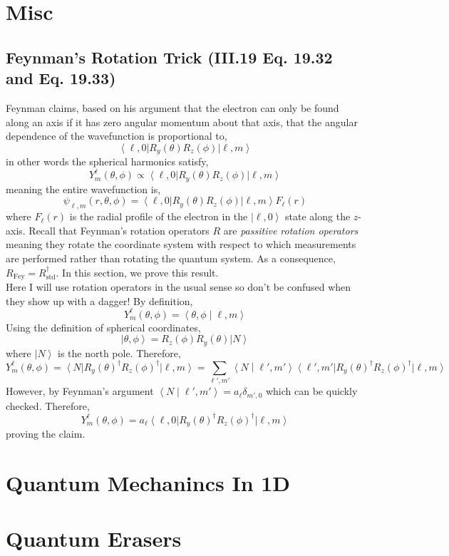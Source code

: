 \documentclass[12pt]{extarticle}
\theoremstyle{definition}
\newcommand{\inner}[2]{\left< #1 \middle| #2 \right>}
\newcommand{\ket}[1]{\left| #1 \right>}
\newcommand{\bra}[1]{\left< #1 \right|}
\begin{document}
\section{Misc}

\subsection{Feynman's Rotation Trick (III.19 Eq. 19.32 and Eq. 19.33)}

Feynman claims, based on his argument that the electron can only be found along an axis if it has zero angular momentum about that axis, that the angular dependence of the wavefunction is proportional to,
\[ \bra{\ell, 0} R_y(\theta) R_z(\phi) \ket{\ell, m} \]
in other words the spherical harmonics satisfy,
\[ Y^\ell_m(\theta, \phi) \propto \bra{\ell, 0} R_y(\theta) R_z(\phi) \ket{\ell, m} \]
meaning the entire wavefunction is,
\[ \psi_{\ell, m}(r, \theta, \phi) = \bra{\ell, 0} R_y(\theta) R_z(\phi) \ket{\ell, m} F_\ell(r) \]
where $F_\ell(r)$ is the radial profile of the electron in the $\ket{\ell, 0}$ state along the $z$-axis. Recall that Feynman's rotation operators $R$ are \textit{passitive rotation operators} meaning they rotate the coordinate system with respect to which measurements are performed rather than rotating the quantum system. As a consequence, $R_{\text{Fey}} = R_{\text{std}}^\dagger$. In this section, we prove this result.
\bigskip\\
Here I will use rotation operators in the usual sense so don't be confused when they show up with a dagger!
By definition,
\[ Y^\ell_m(\theta, \phi) = \inner{\theta, \phi}{\ell, m} \]
Using the definition of spherical coordinates, 
\[ \ket{\theta, \phi} = R_z(\phi) R_y(\theta) \ket{N} \]
where $\ket{N}$ is the north pole. Therefore,
\[ Y^\ell_m(\theta, \phi) = \bra{N} R_y(\theta)^\dagger R_z(\phi)^\dagger \ket{\ell, m} = \sum_{\ell', m'} \inner{N}{\ell',m'} \bra{\ell',m'} R_y(\theta)^\dagger R_z(\phi)^\dagger \ket{\ell, m} \]
However, by Feynman's argument $\inner{N}{\ell',m'} = a_\ell \delta_{m',0}$ which can be quickly checked. Therefore, 
\[ Y^\ell_m(\theta, \phi) = a_\ell \bra{\ell, 0} R_y(\theta)^\dagger R_z(\phi)^\dagger \ket{\ell, m} \]
proving the claim.

\section{Quantum Mechanincs In 1D}

\section{Quantum Erasers}
\end{document}
